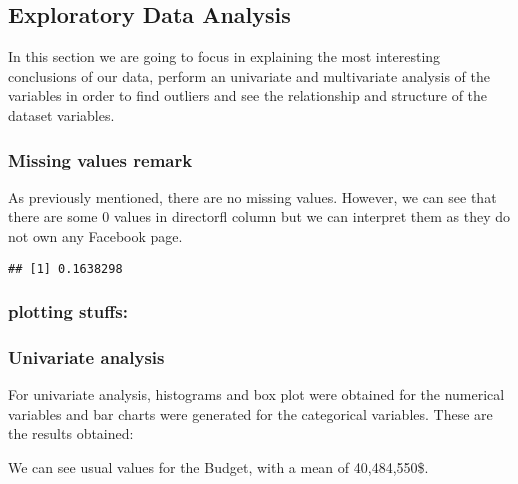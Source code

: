 \documentclass[]{article}
\newenvironment{Shaded}{\begin{snugshade}}{\end{snugshade}}
\newcommand{\KeywordTok}[1]{\textcolor[rgb]{0.13,0.29,0.53}{\textbf{#1}}}
\newcommand{\DecValTok}[1]{\textcolor[rgb]{0.00,0.00,0.81}{#1}}
\newcommand{\OperatorTok}[1]{\textcolor[rgb]{0.81,0.36,0.00}{\textbf{#1}}}
\newcommand{\NormalTok}[1]{#1}
\begin{document}
\subsection{Exploratory Data Analysis}\label{exploratory-data-analysis}

In this section we are going to focus in explaining the most interesting
conclusions of our data, perform an univariate and multivariate analysis
of the variables in order to find outliers and see the relationship and
structure of the dataset variables.

\subsubsection{Missing values remark}\label{missing-values-remark}

As previously mentioned, there are no missing values. However, we can
see that there are some 0 values in directorfl column but we can
interpret them as they do not own any Facebook page.

\begin{Shaded}
\end{Shaded}

\begin{verbatim}
## [1] 0.1638298
\end{verbatim}

\subsubsection{plotting stuffs:}\label{plotting-stuffs}

\subsubsection{Univariate analysis}\label{univariate-analysis}

For univariate analysis, histograms and box plot were obtained for the
numerical variables and bar charts were generated for the categorical
variables. These are the results obtained:

We can see usual values for the Budget, with a mean of 40,484,550\$.
\end{document}
